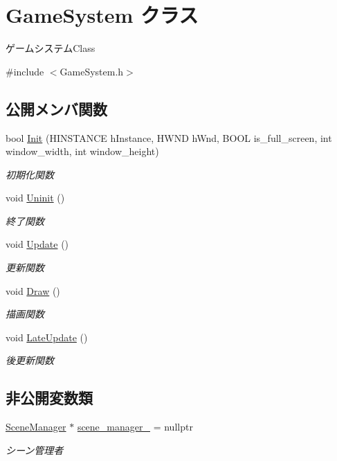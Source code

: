 \hypertarget{class_game_system}{}\section{Game\+System クラス}
\label{class_game_system}


ゲームシステム\+Class  




{\ttfamily \#include $<$Game\+System.\+h$>$}

\subsection*{公開メンバ関数}
\begin{DoxyCompactItemize}
\item 
bool \mbox{\hyperlink{class_game_system_ad4c08500b98490e00ce87a770bb5e981}{Init}} (H\+I\+N\+S\+T\+A\+N\+CE h\+Instance, H\+W\+ND h\+Wnd, B\+O\+OL is\+\_\+full\+\_\+screen, int window\+\_\+width, int window\+\_\+height)
\begin{DoxyCompactList}\small\item\em 初期化関数 \end{DoxyCompactList}\item 
void \mbox{\hyperlink{class_game_system_af76866bd03b84dca6880f1493fd3c9d1}{Uninit}} ()
\begin{DoxyCompactList}\small\item\em 終了関数 \end{DoxyCompactList}\item 
void \mbox{\hyperlink{class_game_system_ab0add1f2bd97d3b125a5682f571053a3}{Update}} ()
\begin{DoxyCompactList}\small\item\em 更新関数 \end{DoxyCompactList}\item 
void \mbox{\hyperlink{class_game_system_a474db0066b23d39e94e0a830140edce5}{Draw}} ()
\begin{DoxyCompactList}\small\item\em 描画関数 \end{DoxyCompactList}\item 
void \mbox{\hyperlink{class_game_system_aa416827abc995e1b8df4a5cf87911baf}{Late\+Update}} ()
\begin{DoxyCompactList}\small\item\em 後更新関数 \end{DoxyCompactList}\end{DoxyCompactItemize}
\subsection*{非公開変数類}
\begin{DoxyCompactItemize}
\item 
\mbox{\hyperlink{class_scene_manager}{Scene\+Manager}} $\ast$ \mbox{\hyperlink{class_game_system_ac398ab7a013177879fd3dd9a9f8d7e48}{scene\+\_\+manager\+\_\+}} = nullptr
\begin{DoxyCompactList}\small\item\em シーン管理者 \end{DoxyCompactList}\end{DoxyCompactItemize}


